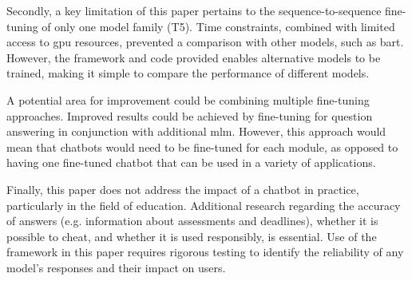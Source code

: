 Secondly, a key limitation of this paper pertains to the sequence-to-sequence fine-tuning of only one model family (T5). Time constraints, combined with limited access to \acrshort{gpu} resources, prevented a comparison with other models, such as \acrshort{bart}. However, the framework and code provided enables alternative models to be trained, making it simple to compare the performance of different models.

A potential area for improvement could be combining multiple fine-tuning approaches. Improved results could be achieved by fine-tuning for question answering in conjunction with additional \acrlong{mlm}. However, this approach would mean that chatbots would need to be fine-tuned for each module, as opposed to having one fine-tuned chatbot that can be used in a variety of applications.

Finally, this paper does not address the impact of a chatbot in practice, particularly in the field of education. Additional research regarding the accuracy of answers (e.g. information about assessments and deadlines), whether it is possible to cheat, and whether it is used responsibly, is essential. Use of the framework in this paper requires rigorous testing to identify the reliability of any model's responses and their impact on users.

